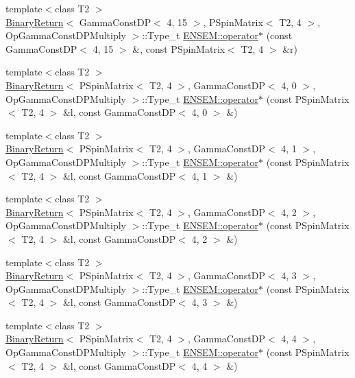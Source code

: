 \begin{DoxyCompactItemize}
\item 
{\footnotesize template$<$class T2 $>$ }\\\mbox{\hyperlink{structBinaryReturn}{Binary\+Return}}$<$ Gamma\+Const\+DP$<$ 4, 15 $>$, P\+Spin\+Matrix$<$ T2, 4 $>$, Op\+Gamma\+Const\+D\+P\+Multiply $>$\+::Type\+\_\+t \mbox{\hyperlink{group__primspinmatrix_gafeff9dceaf056bcf56866006862373d8}{E\+N\+S\+E\+M\+::operator$\ast$}} (const Gamma\+Const\+DP$<$ 4, 15 $>$ \&, const P\+Spin\+Matrix$<$ T2, 4 $>$ \&r)
\item 
{\footnotesize template$<$class T2 $>$ }\\\mbox{\hyperlink{structBinaryReturn}{Binary\+Return}}$<$ P\+Spin\+Matrix$<$ T2, 4 $>$, Gamma\+Const\+DP$<$ 4, 0 $>$, Op\+Gamma\+Const\+D\+P\+Multiply $>$\+::Type\+\_\+t \mbox{\hyperlink{group__primspinmatrix_ga922c6c72866d31038a56946930310c35}{E\+N\+S\+E\+M\+::operator$\ast$}} (const P\+Spin\+Matrix$<$ T2, 4 $>$ \&l, const Gamma\+Const\+DP$<$ 4, 0 $>$ \&)
\item 
{\footnotesize template$<$class T2 $>$ }\\\mbox{\hyperlink{structBinaryReturn}{Binary\+Return}}$<$ P\+Spin\+Matrix$<$ T2, 4 $>$, Gamma\+Const\+DP$<$ 4, 1 $>$, Op\+Gamma\+Const\+D\+P\+Multiply $>$\+::Type\+\_\+t \mbox{\hyperlink{group__primspinmatrix_gae75fd887b0fbf22c05f8739b68d7428c}{E\+N\+S\+E\+M\+::operator$\ast$}} (const P\+Spin\+Matrix$<$ T2, 4 $>$ \&l, const Gamma\+Const\+DP$<$ 4, 1 $>$ \&)
\item 
{\footnotesize template$<$class T2 $>$ }\\\mbox{\hyperlink{structBinaryReturn}{Binary\+Return}}$<$ P\+Spin\+Matrix$<$ T2, 4 $>$, Gamma\+Const\+DP$<$ 4, 2 $>$, Op\+Gamma\+Const\+D\+P\+Multiply $>$\+::Type\+\_\+t \mbox{\hyperlink{group__primspinmatrix_ga6c042cd1d538338f171e9e0b588b7b8e}{E\+N\+S\+E\+M\+::operator$\ast$}} (const P\+Spin\+Matrix$<$ T2, 4 $>$ \&l, const Gamma\+Const\+DP$<$ 4, 2 $>$ \&)
\item 
{\footnotesize template$<$class T2 $>$ }\\\mbox{\hyperlink{structBinaryReturn}{Binary\+Return}}$<$ P\+Spin\+Matrix$<$ T2, 4 $>$, Gamma\+Const\+DP$<$ 4, 3 $>$, Op\+Gamma\+Const\+D\+P\+Multiply $>$\+::Type\+\_\+t \mbox{\hyperlink{group__primspinmatrix_ga7049c9a95590816eb50f8755c19aac7e}{E\+N\+S\+E\+M\+::operator$\ast$}} (const P\+Spin\+Matrix$<$ T2, 4 $>$ \&l, const Gamma\+Const\+DP$<$ 4, 3 $>$ \&)
\item 
{\footnotesize template$<$class T2 $>$ }\\\mbox{\hyperlink{structBinaryReturn}{Binary\+Return}}$<$ P\+Spin\+Matrix$<$ T2, 4 $>$, Gamma\+Const\+DP$<$ 4, 4 $>$, Op\+Gamma\+Const\+D\+P\+Multiply $>$\+::Type\+\_\+t \mbox{\hyperlink{group__primspinmatrix_gabdda28125d8262f0d1b4f071aaa969eb}{E\+N\+S\+E\+M\+::operator$\ast$}} (const P\+Spin\+Matrix$<$ T2, 4 $>$ \&l, const Gamma\+Const\+DP$<$ 4, 4 $>$ \&)

\end{DoxyCompactItemize}
